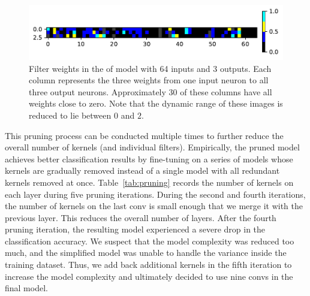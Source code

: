 \documentclass{article}
\begin{document}
%
%
\begin{figure}
    \centering
    \includegraphics[width=\linewidth]{cpic_original_fc}
    \caption{Filter weights in the  of  model with 64 inputs and 3 outputs. Each column represents the three weights from one input neuron to all three output neurons. Approximately 30 of these columns have all weights close to zero. Note that the dynamic range of these images is reduced to lie between $0$ and $2$.}
    \label{fig:cpic_weights_fc}
\end{figure}
%

This pruning process can be conducted multiple times to further reduce the overall number of kernels (and individual filters).
Empirically, the pruned model achieves better classification results by fine-tuning on a series of models whose kernels are gradually removed instead of a single model with all redundant kernels removed at once.
Table~\ref{tab:pruning} records the number of kernels on each layer during five pruning iterations. 
During the second and fourth iterations, the number of kernels on the last \gls{conv} is small enough that we merge it with the previous layer.
This reduces the overall number of layers.
After the fourth pruning iteration, the resulting model experienced a severe drop in the classification accuracy.
We suspect that the model complexity was reduced too much, and the simplified model was unable to handle the variance inside the training dataset.
Thus, we add back additional kernels in the fifth iteration to increase the model complexity and ultimately decided to use nine \glspl{conv} in the final model.
\end{document}
